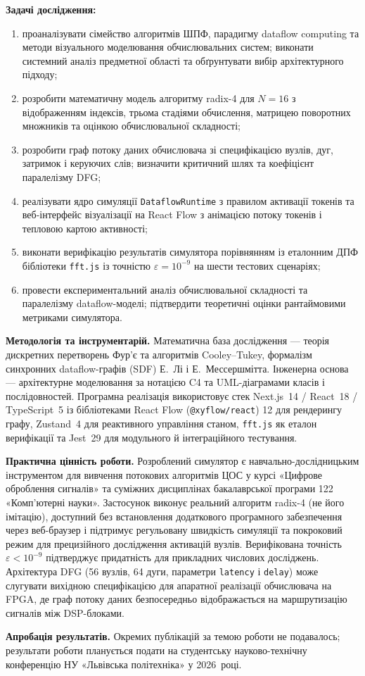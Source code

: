 \textbf{Задачі дослідження:}
\begin{enumerate}
  \item проаналізувати сімейство алгоритмів ШПФ, парадигму dataflow computing та
    методи візуального моделювання обчислювальних систем; виконати системний
    аналіз предметної області та обґрунтувати вибір архітектурного підходу;
  \item розробити математичну модель алгоритму radix-4 для $N = 16$ з
    відображенням індексів, трьома стадіями обчислення, матрицею поворотних
    множників та оцінкою обчислювальної складності;
  \item розробити граф потоку даних обчислювача зі специфікацією вузлів, дуг,
    затримок і керуючих слів; визначити критичний шлях та коефіцієнт
    паралелізму DFG;
  \item реалізувати ядро симуляції \texttt{DataflowRuntime} з правилом активації
    токенів та веб-інтерфейс візуалізації на React Flow з анімацією потоку
    токенів і тепловою картою активності;
  \item виконати верифікацію результатів симулятора порівнянням із еталонним ДПФ
    бібліотеки \texttt{fft.js} із точністю $\varepsilon = 10^{-9}$ на шести
    тестових сценаріях;
  \item провести експериментальний аналіз обчислювальної складності та
    паралелізму dataflow-моделі; підтвердити теоретичні оцінки рантаймовими
    метриками симулятора.
\end{enumerate}

\textbf{Методологія та інструментарій.} Математична база дослідження --- теорія
дискретних перетворень Фур'є та алгоритмів Cooley--Tukey, формалізм синхронних
dataflow-графів (SDF) Е.~Лі і Е.~Мессершмітта. Інженерна основа --- архітектурне
моделювання за нотацією C4 та UML-діаграмами класів і послідовностей. Програмна
реалізація використовує стек Next.js~14 / React~18 / TypeScript~5 із бібліотеками
React Flow (\texttt{@xyflow/react}) 12 для рендерингу графу, Zustand~4 для
реактивного управління станом, \texttt{fft.js} як еталон верифікації та Jest~29
для модульного й інтеграційного тестування.

\textbf{Практична цінність роботи.} Розроблений симулятор є
навчально-дослідницьким інструментом для вивчення потокових алгоритмів ЦОС у
курсі «Цифрове оброблення сигналів» та суміжних дисциплінах бакалаврської
програми 122 «Комп'ютерні науки». Застосунок виконує реальний алгоритм radix-4
(не його імітацію), доступний без встановлення додаткового програмного
забезпечення через веб-браузер і підтримує регульовану швидкість симуляції та
покроковий режим для прецизійного дослідження активацій вузлів. Верифікована
точність $\varepsilon < 10^{-9}$ підтверджує придатність для прикладних числових
досліджень. Архітектура DFG (56 вузлів, 64 дуги, параметри \texttt{latency} і
\texttt{delay}) може слугувати вихідною специфікацією для апаратної реалізації
обчислювача на FPGA, де граф потоку даних безпосередньо відображається на
маршрутизацію сигналів між DSP-блоками.

\textbf{Апробація результатів.} Окремих публікацій за темою роботи не подавалось;
результати роботи планується подати на студентську науково-технічну конференцію
НУ «Львівська політехніка» у 2026~році.